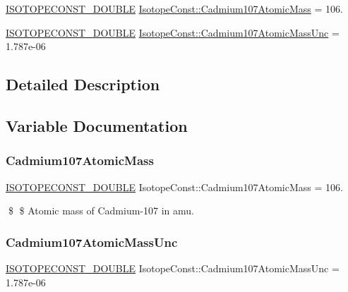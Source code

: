 \begin{DoxyCompactItemize}
\item 
\mbox{\hyperlink{group___isotope_const-_macros_ga8f45a7272ce02c0b4c65c44636ed719a}{I\+S\+O\+T\+O\+P\+E\+C\+O\+N\+S\+T\+\_\+\+D\+O\+U\+B\+LE}} \mbox{\hyperlink{group___isotope_const-_cadmium-_cd107_ga047ea5f0cfe2781b84959a548c2fb42b}{Isotope\+Const\+::\+Cadmium107\+Atomic\+Mass}} = 106.
\item 
\mbox{\hyperlink{group___isotope_const-_macros_ga8f45a7272ce02c0b4c65c44636ed719a}{I\+S\+O\+T\+O\+P\+E\+C\+O\+N\+S\+T\+\_\+\+D\+O\+U\+B\+LE}} \mbox{\hyperlink{group___isotope_const-_cadmium-_cd107_ga5da224503f495b28fa89f2aed80844da}{Isotope\+Const\+::\+Cadmium107\+Atomic\+Mass\+Unc}} = 1.\+787e-\/06
\end{DoxyCompactItemize}


\subsection{Detailed Description}


\subsection{Variable Documentation}
\mbox{\label{group___isotope_const-_cadmium-_cd107_ga047ea5f0cfe2781b84959a548c2fb42b}} 
\subsubsection{\texorpdfstring{Cadmium107\+Atomic\+Mass}{Cadmium107AtomicMass}}
{\footnotesize\ttfamily \mbox{\hyperlink{group___isotope_const-_macros_ga8f45a7272ce02c0b4c65c44636ed719a}{I\+S\+O\+T\+O\+P\+E\+C\+O\+N\+S\+T\+\_\+\+D\+O\+U\+B\+LE}} Isotope\+Const\+::\+Cadmium107\+Atomic\+Mass = 106.}

\$ \$ Atomic mass of Cadmium-\/107 in amu. \mbox{\label{group___isotope_const-_cadmium-_cd107_ga5da224503f495b28fa89f2aed80844da}} 
\subsubsection{\texorpdfstring{Cadmium107\+Atomic\+Mass\+Unc}{Cadmium107AtomicMassUnc}}
{\footnotesize\ttfamily \mbox{\hyperlink{group___isotope_const-_macros_ga8f45a7272ce02c0b4c65c44636ed719a}{I\+S\+O\+T\+O\+P\+E\+C\+O\+N\+S\+T\+\_\+\+D\+O\+U\+B\+LE}} Isotope\+Const\+::\+Cadmium107\+Atomic\+Mass\+Unc = 1.\+787e-\/06}

